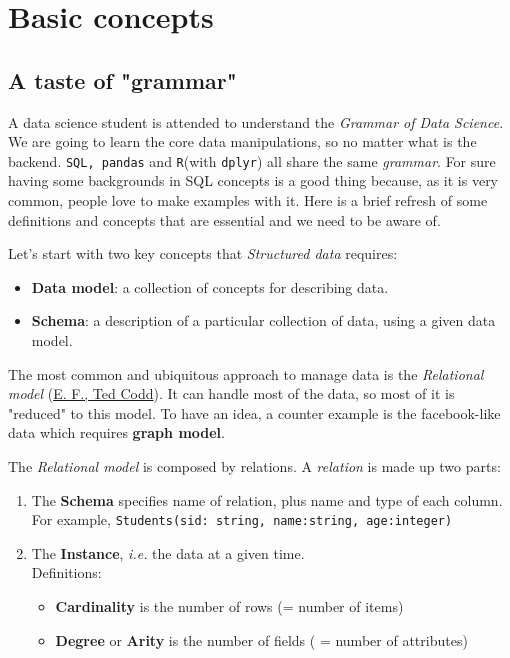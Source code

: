 
\section{Basic concepts}
\subsection{A taste of "grammar"}

A data science student is attended to understand the \emph{Grammar of Data Science}. We are going to learn the core data manipulations, so no matter what is the backend. \texttt{SQL, pandas} and \texttt{R}(with \texttt{dplyr}) all share the same\emph{ grammar}. 
For sure having some backgrounds in SQL concepts is a good thing because, as it is very common, people love to make examples with it. Here is a brief refresh of some definitions and concepts that are essential and we need to be aware of.

Let's start with two key concepts that \emph{Structured data} requires:

\begin{itemize}
  \item {\bf Data model}: a collection of concepts for describing data.
  \item {\bf Schema}: a description of a particular collection of data, using a given data model.
\end{itemize}

The most common and ubiquitous approach to manage data is the \emph{Relational model} (\href{https://en.wikipedia.org/wiki/Edgar\_F.\_Codd}{E. F., Ted Codd}). It can handle most of the data, so most of it is "reduced" to this model. To have an idea, a counter example is the facebook-like data which requires {\bf graph model}. 

The \emph{Relational model} is composed by relations. A \emph{relation} is made up two parts:

 \begin{enumerate}
 \item The {\bf Schema} specifies name of relation, plus name and type of each column. \\ For example, \verb+Students(sid: string, name:string, age:integer)+
  \item The {\bf Instance}, {\it i.e.} the data at a given time. \\
  Definitions:
  \begin{itemize}
   \item {\bf Cardinality} is the number of rows (= number of items)
   \item {\bf Degree} or {\bf Arity} is the number of fields ( = number of attributes)
  \end{itemize}
 \end{enumerate}

